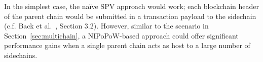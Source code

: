 In the simplest case, the na\"ive SPV approach would work; each blockchain header of the parent chain would be submitted in a transaction payload to the sidechain (c.f. Back et al.~\cite{sidechains}, Section 3.2). However, similar to the scenario in Section~\ref{sec:multichain}, a NIPoPoW-based approach could offer significant performance gains when a single parent chain acts as host to a large number of sidechains.
